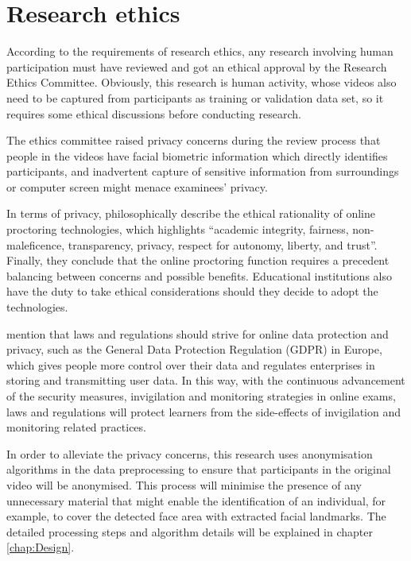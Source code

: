\section{Research ethics}
\label{sec:Research ethics}
According to the requirements of research ethics, any research involving human participation must have reviewed and got an ethical approval by the Research Ethics Committee.
Obviously, this research is human activity, whose videos also need to be captured from participants as training or validation data set, so it requires some ethical discussions before conducting research.

The ethics committee raised privacy concerns during the review process that people in the videos have facial biometric information which directly identifies participants, and inadvertent capture of sensitive information from surroundings or computer screen might menace examinees' privacy.

In terms of privacy, \citet{coghlan2020good} philosophically describe the ethical rationality of online proctoring technologies, which highlights ``academic integrity, fairness, non-maleficence, transparency, privacy, respect for autonomy, liberty, and trust''.
Finally, they conclude that the online proctoring function requires a precedent balancing between concerns and possible benefits.
Educational institutions also have the duty to take ethical considerations should they decide to adopt the technologies.

\citet{bozkurt2020education} mention that laws and regulations should strive for online data protection and privacy, such as the General Data Protection Regulation (GDPR) in Europe, which gives people more control over their data and regulates enterprises in storing and transmitting user data.
In this way, with the continuous advancement of the security measures, invigilation and monitoring strategies in online exams, laws and regulations will protect learners from the side-effects of invigilation and monitoring related practices.

In order to alleviate the privacy concerns, this research uses anonymisation algorithms in the data preprocessing to ensure that participants in the original video will be anonymised.
This process will minimise the presence of any unnecessary material that might enable the identification of an individual, for example, to cover the detected face area with extracted facial landmarks.
The detailed processing steps and algorithm details will be explained in chapter \ref{chap:Design}.
